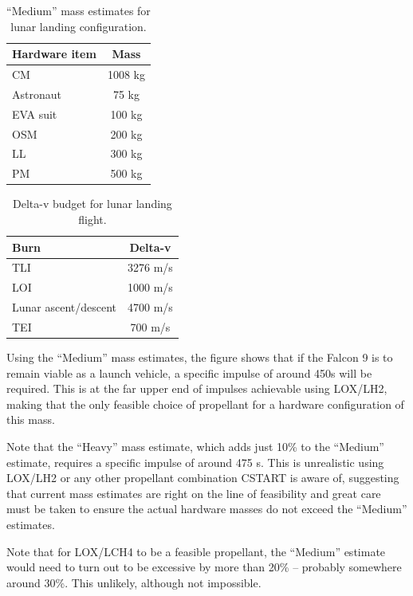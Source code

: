 \documentclass{report}
\begin{document}
\begin{table}
\centering
\caption{``Medium'' mass estimates for lunar landing configuration.}
\label{tab:fuel_analysis}
\begin{tabular}{ | l | c | }
\hline
\textbf{Hardware item} & \textbf{Mass} \\
\hline
\hline
CM		& 1008 kg \\
\hline
Astronaut	& 75 kg \\
\hline
EVA suit	& 100 kg \\
\hline
OSM		& 200 kg \\
\hline
LL		& 300 kg \\
\hline
PM		& 500 kg \\
\hline
\end{tabular}
\end{table}

\begin{table}
\centering
\caption{Delta-v budget for lunar landing flight.}
\label{tab:deltav-budget}
\begin{tabular}{ | l | c | }
\hline
\textbf{Burn} & \textbf{Delta-v} \\
\hline
\hline
TLI	& 3276 m/s \\
\hline
LOI	& 1000 m/s \\
\hline
Lunar ascent/descent	& 4700 m/s \\
\hline
TEI	& 700 m/s \\
\hline
\end{tabular}
\end{table}

Using the ``Medium'' mass estimates, the figure shows that if the Falcon 9 is to remain viable as a launch vehicle, a specific impulse of around 450s will be required.  This is at the far upper end of impulses achievable using LOX/LH2, making that the only feasible choice of propellant for a hardware configuration of this mass.

Note that the ``Heavy'' mass estimate, which adds just 10\% to the ``Medium'' estimate, requires a specific impulse of around 475 s.  This is unrealistic using LOX/LH2 or any other propellant combination CSTART is aware of, suggesting that current mass estimates are right on the line of feasibility and great care must be taken to ensure the actual hardware masses do not exceed the ``Medium'' estimates.

Note that for LOX/LCH4 to be a feasible propellant, the ``Medium'' estimate would need to turn out to be excessive by more than 20\% -- probably somewhere around 30\%.  This unlikely, although not impossible.
\end{document}
